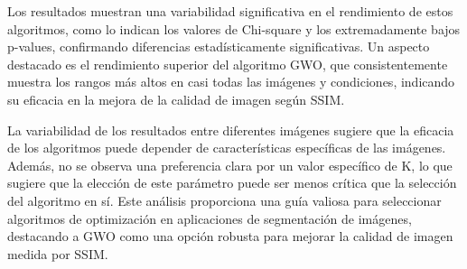 \documentclass[conference]{IEEEtran}
\begin{document}
\noindent Los resultados muestran una variabilidad significativa en el rendimiento de estos algoritmos, como lo indican los valores de Chi-square y los extremadamente bajos p-values, confirmando diferencias estadísticamente significativas. Un aspecto destacado es el rendimiento superior del algoritmo GWO, que consistentemente muestra los rangos más altos en casi todas las imágenes y condiciones, indicando su eficacia en la mejora de la calidad de imagen según SSIM. 

\noindent La variabilidad de los resultados entre diferentes imágenes sugiere que la eficacia de los algoritmos puede depender de características específicas de las imágenes. Además, no se observa una preferencia clara por un valor específico de K, lo que sugiere que la elección de este parámetro puede ser menos crítica que la selección del algoritmo en sí. Este análisis proporciona una guía valiosa para seleccionar algoritmos de optimización en aplicaciones de segmentación de imágenes, destacando a GWO como una opción robusta para mejorar la calidad de imagen medida por SSIM.
\end{document}
